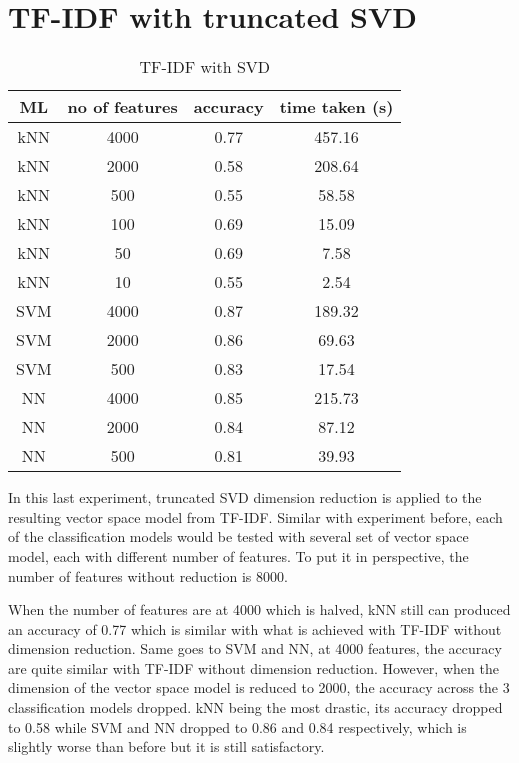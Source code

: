 \clearpage
\section{TF-IDF with truncated SVD}

\begin{table} [ht]
	\centering
	\begin{tabular}{|| c | c | c | c||}
		\hline
		ML & no of features & accuracy & time taken (s) \\ [0.5ex]
		\hline\hline
		kNN & 4000 & 0.77 & 457.16 \\
		\hline
		kNN & 2000 & 0.58 & 208.64 \\ 
		\hline
		kNN & 500 & 0.55 & 58.58 \\ 
		\hline
		kNN & 100 & 0.69 & 15.09 \\
		\hline
		kNN & 50 & 0.69 & 7.58 \\ 
		\hline
		kNN & 10 & 0.55 & 2.54 \\ 
		\hline\hline
		SVM & 4000 & 0.87 & 189.32 \\
		\hline
		SVM & 2000 & 0.86 & 69.63 \\
		\hline
		SVM & 500 & 0.83 & 17.54 \\
		\hline\hline
		NN & 4000 & 0.85 & 215.73 \\
		\hline
		NN & 2000 & 0.84 & 87.12 \\
		\hline
		NN & 500 & 0.81 & 39.93 \\
		\hline
	\end{tabular}
\caption{TF-IDF with SVD}
\label{tbl:tfidfSvd}
\end{table}

In this last experiment, truncated SVD dimension reduction is applied to the resulting vector space model from TF-IDF. Similar with experiment before, each of the classification models would be tested with several set of vector space model, each with different number of features. To put it in perspective, the number of features without reduction is 8000. 

When the number of features are at 4000 which is halved, kNN still can produced an accuracy of 0.77 which is similar with what is achieved with TF-IDF without dimension reduction. Same goes to SVM and NN, at 4000 features, the accuracy are quite similar with TF-IDF without dimension reduction. However, when the dimension of the vector space model is reduced to 2000, the accuracy across the 3 classification models dropped. kNN being the most drastic, its accuracy dropped to 0.58 while SVM and NN dropped to 0.86 and 0.84 respectively, which is slightly worse than before but it is still satisfactory.

